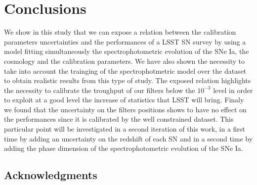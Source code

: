 \documentclass[\docopts]{\docclass}
\begin{document}

\section{Conclusions}
\label{sec::conclusions}

We show in this study that we can expose a relation between the calibration  parameters uncertainties and the performances of a LSST SN survey by using a model fitting simultaneously the spectrophotometric evolution of the SNe Ia, the cosmology and the calibration parameters.
We have also shown the necessity to take into account the trainging of the spectrophotmetric model over the dataset to obtain realistic results from this type of study.
The exposed relation highlights the necessity to calibrate the troughput of our filters below the $10^{-3}$ level in order to exploit at a good level the increase of statistics that LSST will bring.
Finaly we found that the uncertainty on the filters positions shows to have no effect on the performances since it is calibrated by the well constrained dataset. This particular point will be investigated in a second iteration of this work, in a first time by adding an uncertainty on the redshift of each SN and in a second time by adding the phase dimension of the spectrophotometric evolution of the SNe Ia.



\subsection*{Acknowledgments}








\end{document}

